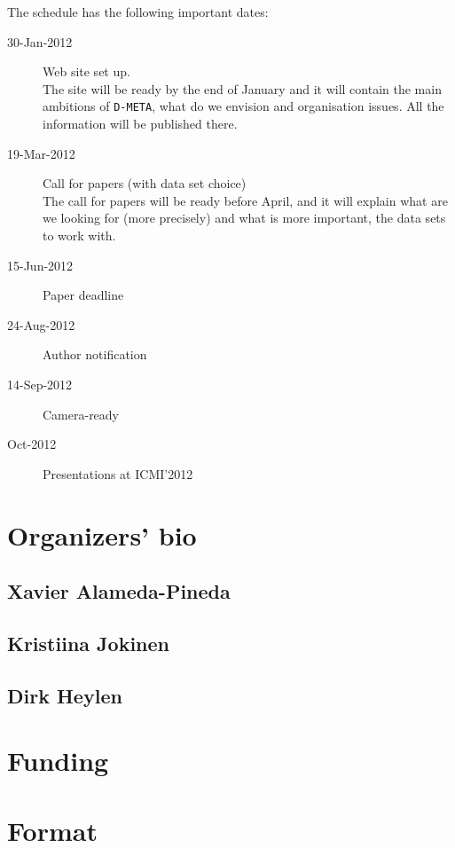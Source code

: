 \documentclass{sig-alternate}
\begin{document}
The schedule has the following important dates:
\begin{description}
 \item[30-Jan-2012] Web site set up.\\
 The site will be ready by the end of January and it will contain the main ambitions of \texttt{D-META}, what do we
envision and organisation issues. All the information will be published there.
 \item[19-Mar-2012] Call for papers (with data set choice)\\
 The call for papers will be ready before April, and it will explain what are we looking for (more precisely) and what
is more important, the data sets to work with.
 \item[15-Jun-2012] Paper deadline
 \item[24-Aug-2012] Author notification
 \item[14-Sep-2012] Camera-ready
 \item[Oct-2012] Presentations at ICMI'2012
\end{description}


\section{Organizers' bio}
\subsection{Xavier Alameda-Pineda}
\subsection{Kristiina Jokinen}
\subsection{Dirk Heylen}

\section{Funding}

\section{Format}



\end{document}
